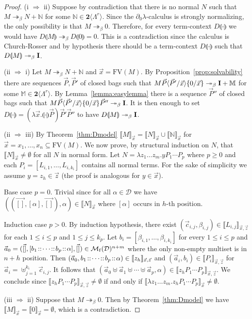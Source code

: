 \documentclass{LMCS}
\newcommand{\bool}{\mathbf{2}}
\newcommand{\dzlam}{\ensuremath{\partial_0\lambda}}
\newcommand{\lam}{\ensuremath{\lambda}}
\renewcommand{\hole}[1]{\llparenthesis #1\rrparenthesis}
\newcommand{\FV}{\mathrm{FV}}
\newcommand{\Set}[1]{\Lambda^{#1}}
\newcommand{\sums}[1]{\bool\langle\Set{#1}\rangle}
\newcommand{\msto}{\twoheadrightarrow}
\newcommand{\subst}[2]{\{ #2 / #1 \}}	\newcommand{\dg}[2]{\mathrm{deg}_{#1}(#2)} \newcommand{\obsle}{\sqsubseteq_{\mathcal{O}}}
\newcommand{\Int}[1]{\llbracket #1\rrbracket} \newcommand{\trm}[1]{#1^{\textrm{--}}}
\newcommand{\Mfin}[1]{\mathcal{M}_{\mathrm{f}}(#1)}
\newcommand{\mcup}{\uplus}
\newcommand{\seq}[1]{\vec{#1}}
\newcommand{\sM}{\mathbb{M}}
\newcommand{\sN}{\mathbb{N}}
\newcommand{\gb}{\beta}
\newcommand{\cD}{\mathcal{D}}
\begin{document}
\begin{proof} (i $\Rightarrow$ ii) Suppose by contradiction that there is no normal $N$ such that $M \msto_\gb N + \sN$ for some $\sN\in\sums{r}$.
Since the \dzlam-calculus is strongly normalizing, the only possibility is that $M\msto_\gb 0$.
Therefore, for every term-context $D\hole{\cdot}$ we would have $D\hole{M}\msto_\gb D\hole{0} = 0$.
This is a contradiction since the calculus is Church-Rosser and by hypothesis there should be a term-context $D\hole{\cdot}$ such that $D\hole{M}\msto_\beta \bold{I}$.

(ii $\Rightarrow$ i) Let $M \msto_\gb N + \sN$ and $\seq x = \FV(M)$. 
By Proposition~\ref{prop:solvability} there are sequences $\seq P,\seq P'$ of closed bags such that 
$M\seq P\lsubst{\seq x}{\seq P'}\subst{\seq x}{0}\msto_\gb \bold{I} + \sM$ for some $\sM\in\sums{r}$.
By Lemma~\ref{lemma:easylemma} there is a sequence $\seq P''$ of closed bags such that 
$M\seq P\lsubst{\seq x}{\seq P'}\subst{\seq x}{0}\seq P''\msto_\gb \bold{I}$. 
It is then enough to set $D\hole{\cdot} = (\lam \seq x.\hole{\cdot}\seq P)\seq P'\seq P''$
to have $D\hole{M}\msto_\gb \bold{I}$.

(ii $\Rightarrow$ iii) By Theorem~\ref{thm:Dmodel} $\Int{M}_{\seq x} = \Int{N}_{\seq x} \cup \Int{\sN}_{\seq x}$ for $\seq x = x_1,\dots,x_n\subseteq\FV(M)$.
We now prove, by structural induction on $N$, that $\Int{N}_{\seq x}\neq\emptyset$ for all $N$ in normal form. 
Let $N = \lambda z_1\dots z_m.yP_1\cdots P_p$ where $p\ge 0$ and each $P_i = [L_{i,1},\dots,L_{i,k_i}]$ 
contains all normal terms.
For the sake of simplicity we assume $y = z_h\in\seq z$ (the proof is analogous for $y\in\seq x$).

Base case $p=0$. Trivial since for all $\alpha\in\cD$ we have $((\seq{[]},[\alpha],\seq{[]}),\alpha)\in\Int{N}_{\seq x}$ where $[\alpha]$ occurs in $h$-th position.

Induction case $p>0$. By induction hypothesis, there exist 
$(\seq c_{i,j},\gb_{i,j}) \in \Int{L_{i,j}}_{\seq x,\seq z}$ for each $1\le i\le p$ and $1\le j\le k_p$.
Let $b_i = [\gb_{i,1},\dots,\gb_{i,k_i}]$ for every $1\le i \le p$
and
$\seq a_0 = (\seq{[]},[b_1\at \cdots\at b_p\at \alpha],\seq{[]})\in\Mfin{\cD}^{n+m}$ where
the only non-empty multiset is in $n+h$ position.
Then $(\seq a_0,b_1\at \cdots\at b_p\at \alpha)\in \Int{z_h}_{\seq x,\seq z}$ and $(\seq a_i,b_i) \in\Int{P_i}_{\seq x,\seq z}$ for $\seq a_i = \mcup_{j = 1}^{k_i} \seq c_{i,j}$.
It follows that $(\seq a_0\mcup\seq a_1\mcup\cdots\mcup \seq a_p,\alpha)\in\Int{z_hP_1\cdots P_p}_{\seq x,\seq z}$.
We conclude since $\Int{z_hP_1\cdots P_p}_{\seq x,\seq z}\neq\emptyset$ if and only if $\Int{\lam z_1\dots z_m.z_hP_1\cdots P_p}_{\seq x}\neq\emptyset$.


(iii $\Rightarrow$ ii) Suppose that $M\msto_\gb 0$. Then by Theorem~\ref{thm:Dmodel} we have $\Int{M}_{\seq x} = \Int{0}_{\seq x} = \emptyset$,
which is a contradiction.
\end{proof}
\end{document}
